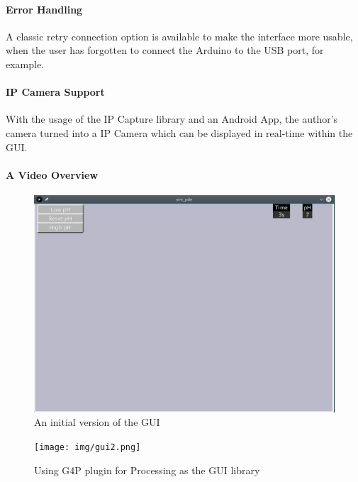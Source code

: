 \paragraph{Error Handling}

A classic retry connection option is available to make the interface more usable,
when the user has forgotten to connect the Arduino to the USB port,
for example.

\paragraph{IP Camera Support}
With the usage of the IP Capture library \cite{ipcapture_2016} and an Android App,
the author's camera turned into a IP Camera which can be displayed in real-time within the GUI.


\paragraph{A Video Overview}
\label{sec:video}


\begin{figure}[h]
    \centering
    \includegraphics[width=.7\textwidth]{img/gui1.png}
    \caption{An initial version of the GUI}
    \label{fig:gui}
\end{figure}

\begin{figure}[h]
    \centering
    \texttt{[image: img/gui2.png]}
    \caption{Using G4P plugin for Processing as the GUI library}
    \label{fig:g4p}
\end{figure}
